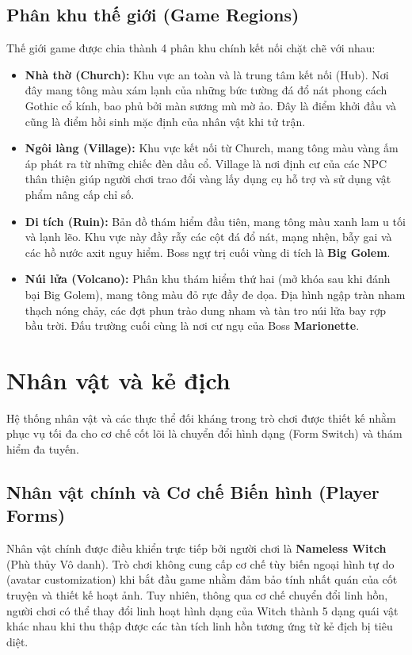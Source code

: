\documentclass[../DoAn.tex]{subfiles}
\begin{document}
\subsection{Phân khu thế giới (Game Regions)}
Thế giới game được chia thành 4 phân khu chính kết nối chặt chẽ với nhau:
\begin{itemize}
    \item \textbf{Nhà thờ (Church):} Khu vực an toàn và là trung tâm kết nối (Hub). Nơi đây mang tông màu xám lạnh của những bức tường đá đổ nát phong cách Gothic cổ kính, bao phủ bởi màn sương mù mờ ảo. Đây là điểm khởi đầu và cũng là điểm hồi sinh mặc định của nhân vật khi tử trận.
    \item \textbf{Ngôi làng (Village):} Khu vực kết nối từ Church, mang tông màu vàng ấm áp phát ra từ những chiếc đèn dầu cổ. Village là nơi định cư của các NPC thân thiện giúp người chơi trao đổi vàng lấy dụng cụ hỗ trợ và sử dụng vật phẩm nâng cấp chỉ số.
    \item \textbf{Di tích (Ruin):} Bản đồ thám hiểm đầu tiên, mang tông màu xanh lam u tối và lạnh lẽo. Khu vực này đầy rẫy các cột đá đổ nát, mạng nhện, bẫy gai và các hồ nước axit nguy hiểm. Boss ngự trị cuối vùng di tích là \textbf{Big Golem}.
    \item \textbf{Núi lửa (Volcano):} Phân khu thám hiểm thứ hai (mở khóa sau khi đánh bại Big Golem), mang tông màu đỏ rực đầy đe dọa. Địa hình ngập tràn nham thạch nóng chảy, các đợt phun trào dung nham và tàn tro núi lửa bay rợp bầu trời. Đấu trường cuối cùng là nơi cư ngụ của Boss \textbf{Marionette}.
\end{itemize}

\section{Nhân vật và kẻ địch}
Hệ thống nhân vật và các thực thể đối kháng trong trò chơi được thiết kế nhằm phục vụ tối đa cho cơ chế cốt lõi là chuyển đổi hình dạng (Form Switch) và thám hiểm đa tuyến.

\subsection{Nhân vật chính và Cơ chế Biến hình (Player Forms)}
\label{subsection:3.7.1}

Nhân vật chính được điều khiển trực tiếp bởi người chơi là \textbf{Nameless Witch} (Phù thủy Vô danh). Trò chơi không cung cấp cơ chế tùy biến ngoại hình tự do (avatar customization) khi bắt đầu game nhằm đảm bảo tính nhất quán của cốt truyện và thiết kế hoạt ảnh. Tuy nhiên, thông qua cơ chế chuyển đổi linh hồn, người chơi có thể thay đổi linh hoạt hình dạng của Witch thành 5 dạng quái vật khác nhau khi thu thập được các tàn tích linh hồn tương ứng từ kẻ địch bị tiêu diệt.
\end{document}
